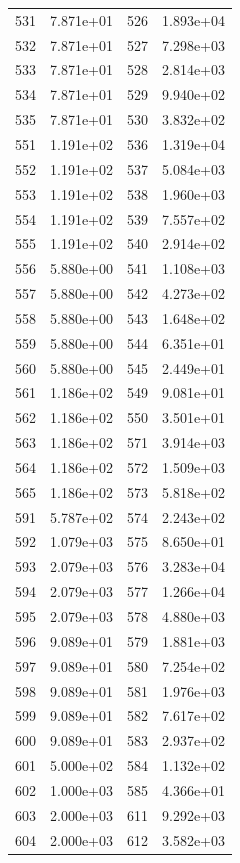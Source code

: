 \documentclass[12pt]{article}
\begin{document}
\begin{longtable}{@{}cccc@{}}
531 & 7.871e+01 & 526 & 1.893e+04 \\
532 & 7.871e+01 & 527 & 7.298e+03 \\
533 & 7.871e+01 & 528 & 2.814e+03 \\
534 & 7.871e+01 & 529 & 9.940e+02 \\
535 & 7.871e+01 & 530 & 3.832e+02 \\
551 & 1.191e+02 & 536 & 1.319e+04 \\
552 & 1.191e+02 & 537 & 5.084e+03 \\
553 & 1.191e+02 & 538 & 1.960e+03 \\
554 & 1.191e+02 & 539 & 7.557e+02 \\
555 & 1.191e+02 & 540 & 2.914e+02 \\
556 & 5.880e+00 & 541 & 1.108e+03 \\
557 & 5.880e+00 & 542 & 4.273e+02 \\
558 & 5.880e+00 & 543 & 1.648e+02 \\
559 & 5.880e+00 & 544 & 6.351e+01 \\
560 & 5.880e+00 & 545 & 2.449e+01 \\
561 & 1.186e+02 & 549 & 9.081e+01 \\
562 & 1.186e+02 & 550 & 3.501e+01 \\
563 & 1.186e+02 & 571 & 3.914e+03 \\
564 & 1.186e+02 & 572 & 1.509e+03 \\
565 & 1.186e+02 & 573 & 5.818e+02 \\
591 & 5.787e+02 & 574 & 2.243e+02 \\
592 & 1.079e+03 & 575 & 8.650e+01 \\
593 & 2.079e+03 & 576 & 3.283e+04 \\
594 & 2.079e+03 & 577 & 1.266e+04 \\
595 & 2.079e+03 & 578 & 4.880e+03 \\
596 & 9.089e+01 & 579 & 1.881e+03 \\
597 & 9.089e+01 & 580 & 7.254e+02 \\
598 & 9.089e+01 & 581 & 1.976e+03 \\
599 & 9.089e+01 & 582 & 7.617e+02 \\
600 & 9.089e+01 & 583 & 2.937e+02 \\
601 & 5.000e+02 & 584 & 1.132e+02 \\
602 & 1.000e+03 & 585 & 4.366e+01 \\
603 & 2.000e+03 & 611 & 9.292e+03 \\
604 & 2.000e+03 & 612 & 3.582e+03 \\

\end{longtable}
\end{document}
